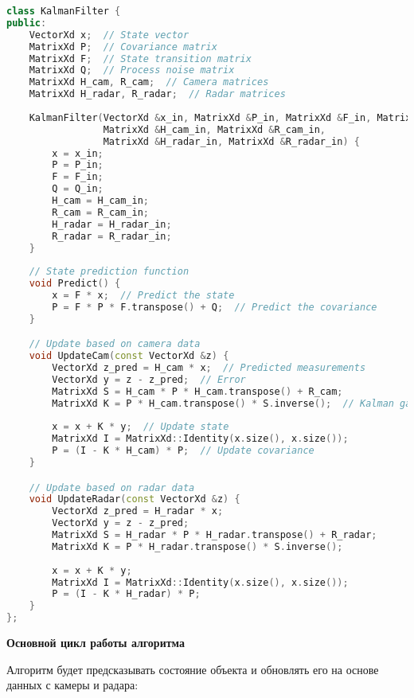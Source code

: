 \begin{lstlisting}[language=C++]
class KalmanFilter {
public:
    VectorXd x;  // State vector
    MatrixXd P;  // Covariance matrix
    MatrixXd F;  // State transition matrix
    MatrixXd Q;  // Process noise matrix
    MatrixXd H_cam, R_cam;  // Camera matrices
    MatrixXd H_radar, R_radar;  // Radar matrices
    
    KalmanFilter(VectorXd &x_in, MatrixXd &P_in, MatrixXd &F_in, MatrixXd &Q_in,
                 MatrixXd &H_cam_in, MatrixXd &R_cam_in,
                 MatrixXd &H_radar_in, MatrixXd &R_radar_in) {
        x = x_in;
        P = P_in;
        F = F_in;
        Q = Q_in;
        H_cam = H_cam_in;
        R_cam = R_cam_in;
        H_radar = H_radar_in;
        R_radar = R_radar_in;
    }
    
    // State prediction function
    void Predict() {
        x = F * x;  // Predict the state
        P = F * P * F.transpose() + Q;  // Predict the covariance
    }

    // Update based on camera data
    void UpdateCam(const VectorXd &z) {
        VectorXd z_pred = H_cam * x;  // Predicted measurements
        VectorXd y = z - z_pred;  // Error
        MatrixXd S = H_cam * P * H_cam.transpose() + R_cam;
        MatrixXd K = P * H_cam.transpose() * S.inverse();  // Kalman gain
        
        x = x + K * y;  // Update state
        MatrixXd I = MatrixXd::Identity(x.size(), x.size());
        P = (I - K * H_cam) * P;  // Update covariance
    }

    // Update based on radar data
    void UpdateRadar(const VectorXd &z) {
        VectorXd z_pred = H_radar * x;
        VectorXd y = z - z_pred;
        MatrixXd S = H_radar * P * H_radar.transpose() + R_radar;
        MatrixXd K = P * H_radar.transpose() * S.inverse();
        
        x = x + K * y;
        MatrixXd I = MatrixXd::Identity(x.size(), x.size());
        P = (I - K * H_radar) * P;
    }
};
\end{lstlisting}

\textbf{Основной цикл работы алгоритма}

Алгоритм будет предсказывать состояние объекта и обновлять его на основе данных с камеры и радара:

